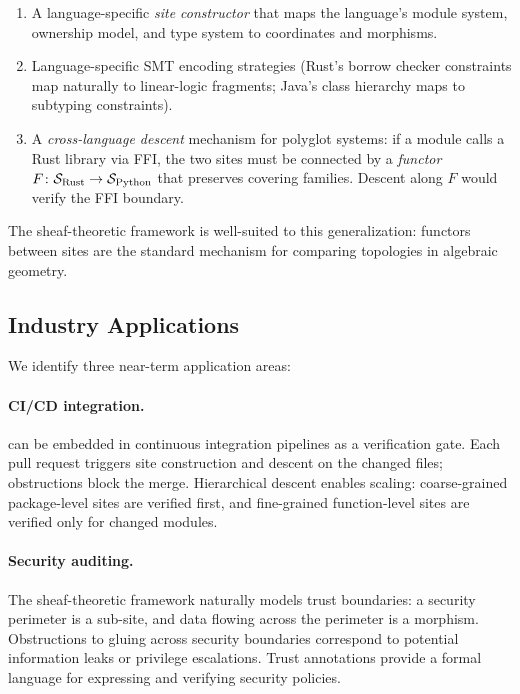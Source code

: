 \begin{enumerate}[leftmargin=1.5em]
  \item A language-specific \emph{site constructor} that maps the
    language's module system, ownership model, and type system to
    coordinates and morphisms.
  \item Language-specific SMT encoding strategies (Rust's borrow
    checker constraints map naturally to linear-logic fragments;
    Java's class hierarchy maps to subtyping constraints).
  \item A \emph{cross-language descent} mechanism for polyglot
    systems: if a \Python{} module calls a Rust library via FFI,
    the two sites must be connected by a \emph{functor}
    $F\colon \mathcal{S}_{\mathrm{Rust}} \to \mathcal{S}_{\mathrm{Python}}$
    that preserves covering families.  Descent along $F$ would
    verify the FFI boundary.
\end{enumerate}

\noindent
The sheaf-theoretic framework is well-suited to this generalization:
functors between sites are the standard mechanism for comparing
topologies in algebraic geometry.

\subsection{Industry Applications}\label{sec:future-industry}

We identify three near-term application areas:

\paragraph{CI/CD integration.}\label{sec:future-hierarchical}
\JuGeo{} can be embedded in continuous integration pipelines as a
verification gate.  Each pull request triggers site construction and
descent on the changed files; obstructions block the merge.
Hierarchical descent enables scaling: coarse-grained package-level
sites are verified first, and fine-grained function-level sites are
verified only for changed modules.

\paragraph{Security auditing.}
The sheaf-theoretic framework naturally models trust boundaries: a
security perimeter is a sub-site, and data flowing across the
perimeter is a morphism.  Obstructions to gluing across security
boundaries correspond to potential information leaks or privilege
escalations.  Trust annotations provide a formal language for
expressing and verifying security policies.

